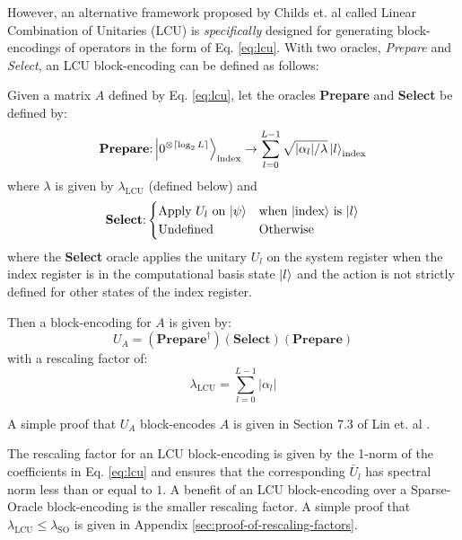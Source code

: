 However, an alternative framework proposed by Childs et. al \cite{childs2012hamiltonian} called Linear Combination of Unitaries (LCU) is \textit{specifically} designed for generating block-encodings of operators in the form of Eq. \ref{eq:lcu}. 
With two oracles, \textit{Prepare} and \textit{Select}, an LCU block-encoding can be defined as follows:
\begin{theorem}
    \label{th:lcu}
    Given a matrix $A$ defined by Eq. \ref{eq:lcu}, let the oracles \textbf{Prepare} and \textbf{Select} be defined by:
    \begin{equation}
        \label{eq:prep-state}
        \textbf{Prepare}\text{:} \ket{0^{\otimes \lceil \log_2 L \rceil}}_\text{index} \rightarrow \sum_{l=0}^{L-1} \sqrt{| \alpha_l | / \lambda} \ket{l}_\text{index}
    \end{equation}
    where $\lambda$ is given by $\lambda_\text{LCU}$ (defined below) and
    \begin{equation}
        \label{eq:select}
        \textbf{Select}\text{:} 
        \begin{cases} 
            \text{Apply $U_l$ on $\ket{\psi}$} & \text{when $\ket{\text{index}}$ is $\ket{l}$} \\
            \text{Undefined} & \text{Otherwise} \\
        \end{cases}
    \end{equation}
    where the \textbf{Select} oracle applies the unitary $U_l$ on the system register when the index register is in the computational basis state $\ket{l}$ and the action is not strictly defined for other states of the index register.

    Then a block-encoding for $A$ is given by:
    \begin{equation}
        \label{eq:lcu-be}
        U_A = (\textbf{Prepare}^\dagger) (\textbf{Select}) (\textbf{Prepare})
    \end{equation}
    with a rescaling factor of:
    \begin{equation}
        \lambda_\text{LCU} = \sum_{l=0}^{L-1} | \alpha_l |
    \end{equation}
\end{theorem}
A simple proof that $U_A$ block-encodes $A$ is given in Section 7.3 of Lin et. al \cite{lin2022lecture}.

The rescaling factor for an LCU block-encoding is given by the 1-norm of the coefficients in Eq. \ref{eq:lcu} and ensures that the corresponding $\bar{U}_l$ has spectral norm less than or equal to $1$.
A benefit of an LCU block-encoding over a Sparse-Oracle block-encoding is the smaller rescaling factor.
A simple proof that $\lambda_\text{LCU} \leq \lambda_\text{SO}$ is given in Appendix \ref{sec:proof-of-rescaling-factors}.

